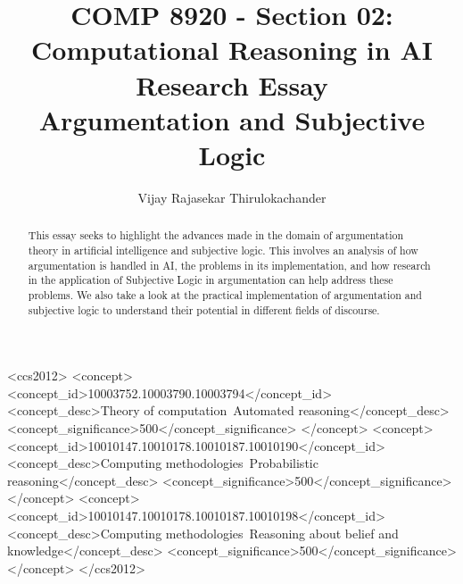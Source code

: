 \documentclass[sigconf]{acmart}
\begin{document}
%
\title{COMP 8920 - Section 02: Computational Reasoning in AI\\ Research Essay \\ Argumentation and Subjective Logic}


\author{Vijay Rajasekar Thirulokachander}

%
\renewcommand{\shortauthors}{Vijay Rajasekar Thirulokachander}

%
\begin{abstract}
This essay seeks to highlight the advances made in the domain of argumentation theory in artificial intelligence and subjective logic. This involves an analysis of how argumentation is handled in AI, the problems in its implementation, and how research in the application of Subjective Logic in argumentation can help address these problems. We also take a look at the practical implementation of argumentation and subjective logic to understand their potential in different fields of discourse.
\end{abstract}

%
%
\begin{CCSXML}
  <ccs2012>
  <concept>
  <concept_id>10003752.10003790.10003794</concept_id>
  <concept_desc>Theory of computation~Automated reasoning</concept_desc>
  <concept_significance>500</concept_significance>
  </concept>
  <concept>
  <concept_id>10010147.10010178.10010187.10010190</concept_id>
  <concept_desc>Computing methodologies~Probabilistic reasoning</concept_desc>
  <concept_significance>500</concept_significance>
  </concept>
  <concept>
  <concept_id>10010147.10010178.10010187.10010198</concept_id>
  <concept_desc>Computing methodologies~Reasoning about belief and knowledge</concept_desc>
  <concept_significance>500</concept_significance>
  </concept>
  </ccs2012>
\end{CCSXML}
\end{document}
